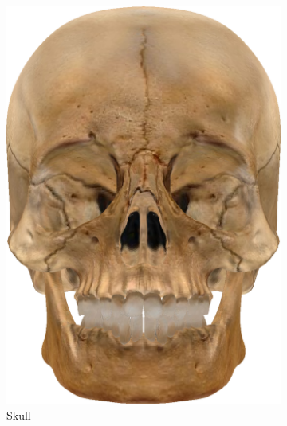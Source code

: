 \begin{figure}[h]
\begin{subfigure}[b]{0.16\textwidth}
        \includegraphics[width=\textwidth]{img/textures/OriginalSkull.png}
        \caption{Skull}
        \label{fig:OriginalSkull}
	\end{subfigure}
    ~
    \begin{subfigure}[b]{0.16\textwidth}

\end{subfigure}
\end{figure}
